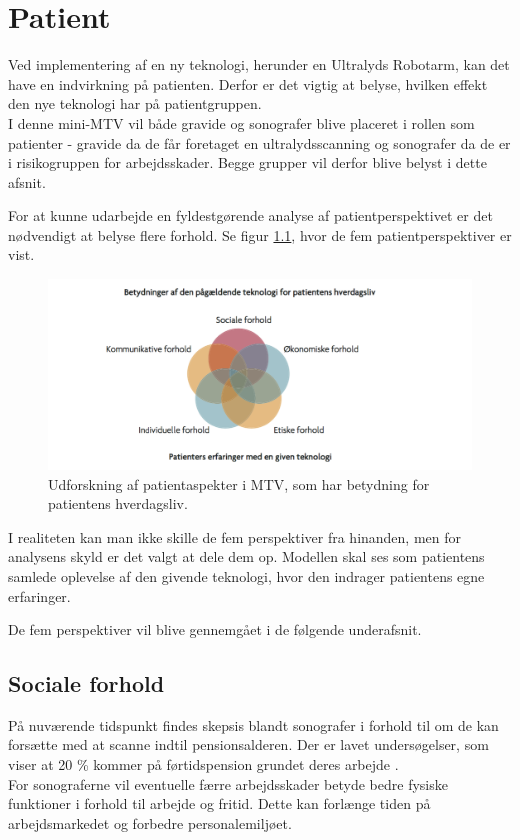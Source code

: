 \chapter{Patient}
Ved implementering af en ny teknologi, herunder en Ultralyds Robotarm, kan det have en indvirkning på patienten. Derfor er det vigtig at belyse, hvilken effekt den nye teknologi har på patientgruppen. \\
I denne mini-MTV vil både gravide og sonografer blive placeret i rollen som patienter - gravide da de får foretaget en ultralydsscanning og sonografer da de er i risikogruppen for arbejdsskader. Begge grupper vil derfor blive belyst i dette afsnit.  

For at kunne udarbejde en fyldestgørende analyse af patientperspektivet er det nødvendigt at belyse flere forhold. Se figur \ref{patientMTV}, hvor de fem patientperspektiver er vist. 
\begin{figure}[h!]\centering
	\includegraphics[width = 1.0\textwidth]{Figurer/PatientaspekterMTV}
	\caption{Udforskning af patientaspekter i MTV, som har betydning for patientens hverdagsliv. \cite{Leavitt}}
	\label{patientMTV}
\end{figure}

I realiteten kan man ikke skille de fem perspektiver fra hinanden, men for analysens skyld er det valgt at dele dem op. Modellen skal ses som patientens samlede oplevelse af den givende teknologi, hvor den indrager patientens egne erfaringer. 

De fem perspektiver vil blive gennemgået i de følgende underafsnit. 

\section{Sociale forhold}
På nuværende tidspunkt findes skepsis blandt sonografer i forhold til om de kan forsætte med at scanne indtil pensionsalderen. Der er lavet undersøgelser, som viser at 20 \% kommer på førtidspension grundet deres arbejde \cite{32}.  \\ 
For sonograferne vil eventuelle færre arbejdsskader betyde bedre fysiske funktioner i forhold til arbejde og fritid. Dette kan forlænge tiden på arbejdsmarkedet og forbedre personalemiljøet.      

